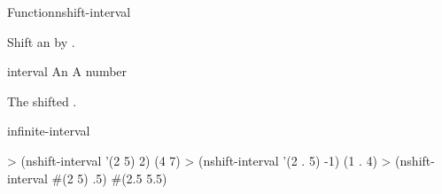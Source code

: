 \documentclass[10pt,twoside,english,pdftex]{article}
\begin{document}
\begin{functiondoc}{Function}{nshift-interval}%
  {
    \returns{} }
%
%

\fnsyntax

\fnpurpose Shift an  by .

\fnpackage {}

\fnmodule {}

\fnargs
\begin{args}{interval}
\arg[interval] An 
\arg[amount] A number
\end{args}

\fnreturns The shifted .

\begin{alsos}{infinite-interval}
\end{alsos}

\fnexamples
%
\W\supp
\begin{example}
> (nshift-interval '(2 5) 2)
(4 7)
> (nshift-interval '(2 . 5) -1)
(1 . 4)
> (nshift-interval #(2 5) .5)
#(2.5 5.5)
\end{example}

\end{functiondoc}

\end{document}
